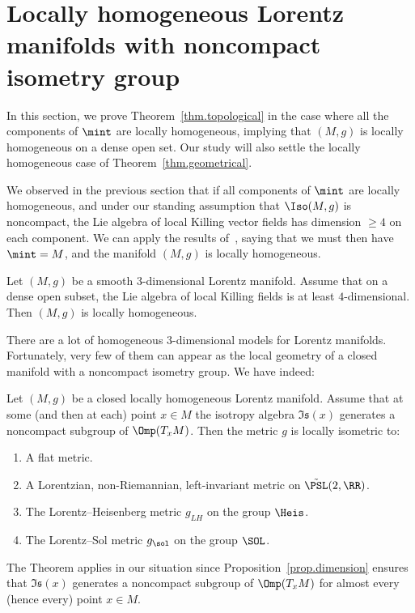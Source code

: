 \section{Locally homogeneous Lorentz manifolds with noncompact isometry group}\label{sec.homogeneous}

In this section, we prove Theorem~\ref{thm.topological} in the case where all the components of $\mint$ are locally homogeneous, implying that $(M,g)$ is locally homogeneous on a dense open set. Our study will also settle the locally homogeneous case of Theorem~\ref{thm.geometrical}.

We observed in the previous section that if all components of $\mint$ are locally homogeneous, and under our standing assumption that $\Iso(M,g)$ is noncompact, the Lie algebra of local Killing vector fields has dimension $\geq 4$ on each component. We can apply the results of~\cite{frances.open}, saying that we must then have $\mint=M$, and the manifold $(M,g)$ is locally homogeneous.

\begin{theo}\label{thm.quasihomogeneous}
Let $(M,g)$ be a smooth $3$-dimensional Lorentz manifold. Assume that on a dense open subset, the Lie algebra of local Killing fields is at least $4$-dimensional. Then $(M,g)$ is locally homogeneous.
\end{theo}

There are a lot of homogeneous $3$-dimensional models for Lorentz manifolds. Fortunately, very few of them can appear as the local geometry of a closed manifold with a noncompact isometry group. We have indeed:


\begin{theo}\label{thm.ghanisorin}
Let $(M,g)$ be a closed locally homogeneous Lorentz manifold. Assume that at some (and then at each) point $x \in M$ the isotropy algebra $\mathfrak{Is}(x)$ generates a noncompact subgroup of $\Omp(T_xM)$. Then the metric $g$ is locally isometric to:
\begin{enumerate}
\item \label{list4.2.1}A flat metric.
\item \label{list4.2.2}A Lorentzian, non-Riemannian, left-invariant metric on $\tilde{\PSL}(2,\RR)$.
\item \label{list4.2.3}The Lorentz--Heisenberg metric $g_{LH}$ on the group $\Heis$.
\item \label{list4.2.4}The Lorentz--Sol metric $g_{\sol}$ on the group $\SOL$.
\end{enumerate}
\end{theo}
The Theorem applies in our situation since Proposition~\ref{prop.dimension} ensures that $\mathfrak{Is}(x)$ generates a noncompact subgroup of $\Omp(T_xM)$ for almost every (hence every) point $x \in M$.

